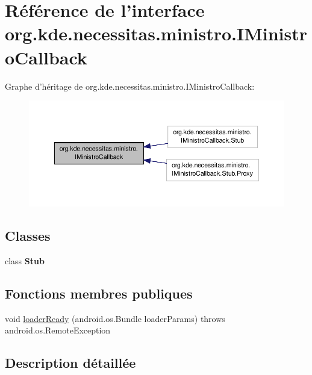 \hypertarget{interfaceorg_1_1kde_1_1necessitas_1_1ministro_1_1_i_ministro_callback}{\section{Référence de l'interface org.\-kde.\-necessitas.\-ministro.\-I\-Ministro\-Callback}
\label{interfaceorg_1_1kde_1_1necessitas_1_1ministro_1_1_i_ministro_callback}
}


Graphe d'héritage de org.\-kde.\-necessitas.\-ministro.\-I\-Ministro\-Callback\-:\nopagebreak
\begin{figure}[H]
\begin{center}
\leavevmode
\includegraphics[width=350pt]{interfaceorg_1_1kde_1_1necessitas_1_1ministro_1_1_i_ministro_callback__inherit__graph}
\end{center}
\end{figure}
\subsection*{Classes}
\begin{DoxyCompactItemize}
\item 
class {\bfseries Stub}
\end{DoxyCompactItemize}
\subsection*{Fonctions membres publiques}
\begin{DoxyCompactItemize}
\item 
void \hyperlink{interfaceorg_1_1kde_1_1necessitas_1_1ministro_1_1_i_ministro_callback_ac67b08ed6184a57c5c732f2f8911a3bf}{loader\-Ready} (android.\-os.\-Bundle loader\-Params)  throws android.\-os.\-Remote\-Exception
\end{DoxyCompactItemize}


\subsection{Description détaillée}


